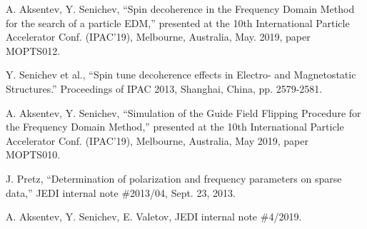 \documentclass[]{elsarticle}
\begin{document}
\begin{thebibliography}{9}
  A. Aksentev, Y. Senichev, ``Spin decoherence in the Frequency Domain Method for the search of a particle EDM,''
  presented at the 10th International Particle Accelerator Conf. (IPAC'19), Melbourne, Australia,
  May. 2019, paper MOPTS012.

  Y. Senichev et al., ``Spin tune decoherence effects in Electro- and Magnetostatic Structures.''
  Proceedings of IPAC 2013, Shanghai, China, pp. 2579-2581.

  A. Aksentev, Y. Senichev, ``Simulation of the Guide Field Flipping Procedure for the Frequency Domain Method,'' 
  presented at the 10th International Particle Accelerator Conf. (IPAC'19), Melbourne, Australia,
  May 2019, paper MOPTS010.

  J. Pretz, ``Determination of polarization and frequency parameters on sparse data,'' JEDI internal
  note \#2013/04, Sept. 23, 2013.
  
  A. Aksentev, Y. Senichev, E. Valetov, JEDI internal note \#4/2019.
  
\end{thebibliography}
\end{document}
